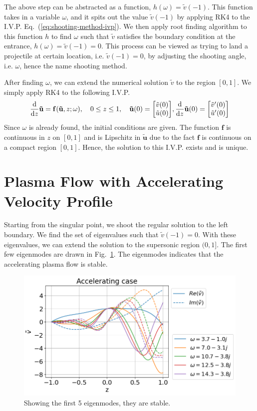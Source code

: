 The above step can be abstracted as a function, $h(\omega) = \tilde{v}(-1)$. This function takes in a variable $\omega$, and it spits out the value $\tilde{v}(-1)$ by applying RK4 to the I.V.P. Eq.~(\ref{eq:shooting-method-ivp}). We then apply root finding algorithm to this function $h$ to find $\omega$ such that $\tilde{v}$ satisfies the boundary condition at the entrance, $h(\omega)=\tilde{v}(-1)=0$. This process can be viewed as trying to land a projectile at certain location, i.e. $\tilde{v}(-1)=0$, by adjusting the shooting angle, i.e. $\omega$, hence the name shooting method.

After finding $\omega$, we can extend the numerical solution $\tilde{v}$ to the region $[0,1]$. We simply apply RK4 to the following I.V.P.
\begin{equation}
	\dv{z}\mathbf{\tilde{u}} = \mathbf{f}(\mathbf{\tilde{u}},z;\omega), \quad
	0 \leq z \leq 1, \quad
	\mathbf{\tilde{u}}(0)=\mqty[\tilde{v}(0) \\ \tilde{u}(0)], \dv{z}\mathbf{\tilde{u}}(0) =\mqty[\tilde{v}'(0) \\ \tilde{u}'(0)]
\end{equation}
Since $\omega$ is already found, the initial conditions are given. The function $\mathbf{f}$ is continuous in $z$ on $[0,1]$ and is Lipschitz in $\mathbf{\tilde{u}}$ due to the fact $\mathbf{f}$ is continuous on a compact region $[0,1]$. Hence, the solution to this I.V.P. exists and is unique.


\section{Plasma Flow with Accelerating Velocity Profile}
Starting from the singular point, we shoot the regular solution to the left boundary. We find the set of eigenvalues such that $\tilde{v}(-1)=0$. With these eigenvalues, we can extend the solution to the supersonic region $(0,1]$. The first few eigenmodes are drawn in Fig.~\ref{fig:results-accelerating-v}. The eigenmodes indicates that the accelerating plasma flow is stable.
\begin{figure} [H]
	\centering
	\includegraphics[width=0.7\linewidth]{figures/results-accelerating-v}
	\caption{Showing the first 5 eigenmodes, they are stable.}
	\label{fig:results-accelerating-v}
\end{figure}
